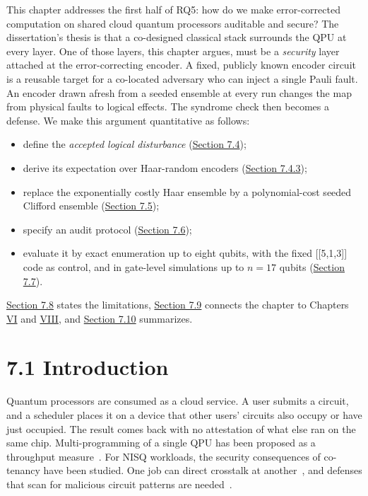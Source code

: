 \documentclass{report}
\theoremstyle{plain}
\theoremstyle{definition}
\theoremstyle{remark}
\begin{document}
This chapter addresses the first half of RQ5: how do we make error-corrected computation on shared cloud quantum processors auditable and secure? The dissertation's thesis is that a co-designed classical stack surrounds the QPU at every layer. One of those layers, this chapter argues, must be a \emph{security} layer attached at the error-correcting encoder. A fixed, publicly known encoder circuit is a reusable target for a co-located adversary who can inject a single Pauli fault. An encoder drawn afresh from a seeded ensemble at every run changes the map from physical faults to logical effects. The syndrome check then becomes a defense. We make this argument quantitative as follows:
\begin{itemize}
  \item define the \emph{accepted logical disturbance} (\hyperref[sec:qec:disturbance]{Section 7.4});
  \item derive its expectation over Haar-random encoders (\hyperref[sec:qec:haar]{Section 7.4.3});
  \item replace the exponentially costly Haar ensemble by a polynomial-cost seeded Clifford ensemble (\hyperref[sec:qec:hse]{Section 7.5});
  \item specify an audit protocol (\hyperref[sec:qec:protocol]{Section 7.6});
  \item evaluate it by exact enumeration up to eight qubits, with the fixed [[5,1,3]] code as control, and in gate-level simulations up to $n=17$ qubits (\hyperref[sec:qec:experiments]{Section 7.7}).
\end{itemize}
\hyperref[sec:qec:discussion]{Section 7.8} states the limitations, \hyperref[sec:qec:relation]{Section 7.9} connects the chapter to Chapters \hyperref[ch:synthesis]{VI} and \hyperref[ch:pqc]{VIII}, and \hyperref[sec:qec:summary]{Section 7.10} summarizes.

\section{7.1 Introduction}\label{sec:qec:intro}

Quantum processors are consumed as a cloud service. A user submits a circuit, and a scheduler places it on a device that other users' circuits also occupy or have just occupied. The result comes back with no attestation of what else ran on the same chip. Multi-programming of a single QPU has been proposed as a throughput measure~\cite{das2019multiprogramming}. For NISQ workloads, the security consequences of co-tenancy have been studied. One job can direct crosstalk at another~\cite{ashsaki2020crosstalk}, and defenses that scan for malicious circuit patterns are needed~\cite{deshpande2022antivirus}.
\end{document}
